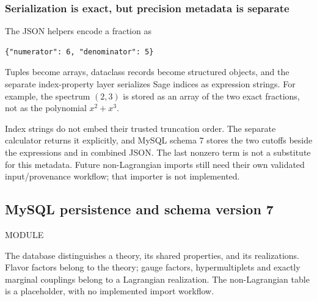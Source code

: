 \documentclass[11pt,a4paper]{article}
\numberwithin{equation}{section}
\newcommand{\file}[1]{\par{\small\sffamily\color{muted}MODULE \quad\texttt{\detokenize{#1}}}\par}
\begin{document}
\subsubsection{Serialization is exact, but precision metadata is separate}
The JSON helpers encode a fraction as
\begin{lstlisting}
{"numerator": 6, "denominator": 5}
\end{lstlisting}
Tuples become arrays, dataclass records become structured objects, and the
separate index-property layer serializes Sage indices as expression strings. For
example, the spectrum $(2,3)$ is stored as an array of the two exact fractions,
not as the polynomial $x^2+x^3$.

Index strings do not embed their trusted truncation order. The separate
calculator returns it explicitly, and MySQL schema 7 stores the two cutoffs
beside the expressions and in combined JSON. The last nonzero term is not a
substitute for this metadata. Future non-Lagrangian imports still need their
own validated input/provenance workflow; that importer is not implemented.

\clearpage
\subsection{MySQL persistence and schema version 7}\label{sec:db}
\file{common/n2_theory_db.py}
The database distinguishes a theory, its shared properties, and its realizations.
Flavor factors belong to the theory; gauge factors, hypermultiplets and exactly
marginal couplings belong to a Lagrangian realization. The non-Lagrangian table
is a placeholder, with no implemented import workflow.
\end{document}
